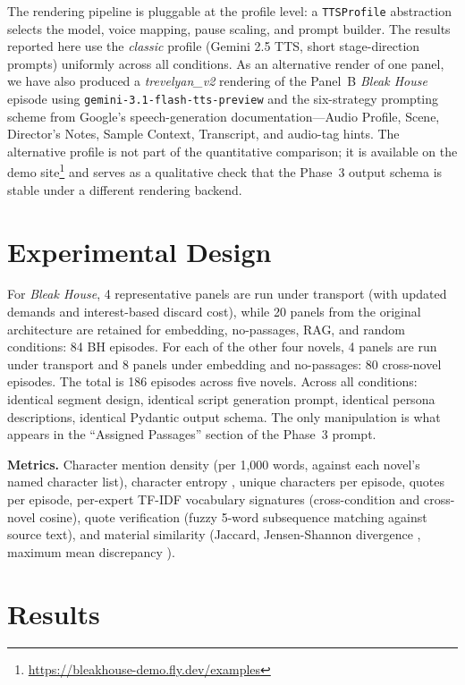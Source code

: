 \documentclass[final]{clv2025}
\begin{document}
The rendering pipeline is pluggable at the profile level: a
\texttt{TTSProfile} abstraction selects the model, voice mapping,
pause scaling, and prompt builder.  The results reported here use the
\textit{classic} profile (Gemini 2.5 TTS, short stage-direction
prompts) uniformly across all conditions.  As an alternative render of
one panel, we have also produced a \textit{trevelyan\_v2} rendering of
the Panel~B \textit{Bleak House} episode using
\texttt{gemini-3.1-flash-tts-preview} and the six-strategy prompting
scheme from Google's speech-generation
documentation---Audio Profile, Scene, Director's Notes, Sample
Context, Transcript, and audio-tag hints.  The alternative profile is
not part of the quantitative comparison; it is available on the demo
site\footnote{\url{https://bleakhouse-demo.fly.dev/examples}} and
serves as a qualitative check that the Phase~3 output schema is
stable under a different rendering backend.


\section{Experimental Design}
\label{sec:experiment}

For \textit{Bleak House}, 4 representative panels are run under
transport (with updated demands and interest-based discard cost),
while 20 panels from the original architecture are retained for
embedding, no-passages, RAG, and random conditions: 84 BH episodes.
For each of the other four novels, 4 panels are run under transport
and 8 panels under embedding and no-passages: 80 cross-novel episodes.
The total is 186 episodes across five novels.  Across all conditions:
identical segment design, identical script generation prompt, identical
persona descriptions, identical Pydantic output schema.  The only
manipulation is what appears in the ``Assigned Passages'' section of
the Phase~3 prompt.

\textbf{Metrics.}  Character mention density (per 1{,}000 words,
against each novel's named character list), character entropy
\citep{shannon1948mathematical}, unique characters per episode, quotes
per episode, per-expert TF-IDF vocabulary signatures (cross-condition
and cross-novel cosine), quote verification (fuzzy 5-word subsequence
matching against source text), and material similarity (Jaccard,
Jensen-Shannon divergence \citep{lin1991divergence}, maximum mean
discrepancy \citep{gretton2012kernel}).


\section{Results}
\label{sec:results}
\end{document}
